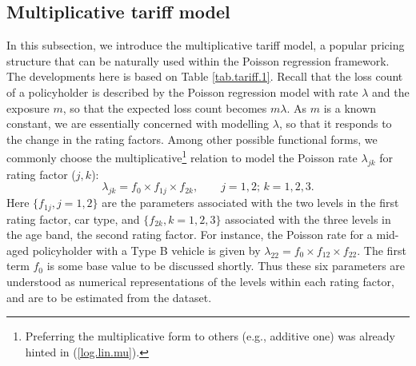 \documentclass[12pt]{article}
\begin{document}
\subsection{Multiplicative tariff model}
In this subsection, we introduce the multiplicative tariff model, a popular pricing structure that can be naturally used within the Poisson regression framework. The developments here is based on Table \ref{tab.tariff.1}. Recall that the loss count of a policyholder is described by the Poisson regression model with rate $\lambda$ and the exposure $m$, so that the expected loss count becomes $m\lambda$. As $m$ is a known constant, we are essentially concerned with modelling $\lambda$, so that it responds to the change in the rating factors. 
 Among other possible functional forms, we commonly choose the multiplicative\footnote{Preferring the multiplicative form to others (e.g., additive one) was already hinted in (\ref{log.lin.mu}).}  relation to model the Poisson rate $\lambda_{jk}$ for rating factor ($j,k$):
\begin{equation}
\label{multiplicative.tarrif}
\lambda_{jk}= f_0 \times f_{1j} \times f_{2k}, \qquad j=1,2;\, k=1, 2,3.
\end{equation} 
Here $\{ f_{1j}, j=1,2\}$ are the parameters associated with the two levels in the first rating factor, car type, and  $\{ f_{2k}, k=1,2,3\}$  associated with the three levels in the age band, the second rating factor. For instance, the Poisson rate for a mid-aged policyholder with a Type B vehicle is given by $\lambda_{22}=f_0 \times f_{12} \times f_{22}$. The first term $f_0$ is some base value to be discussed shortly. Thus these six parameters are understood as numerical representations of the levels within each rating factor, and are to be estimated from the dataset.  \\
\end{document}
